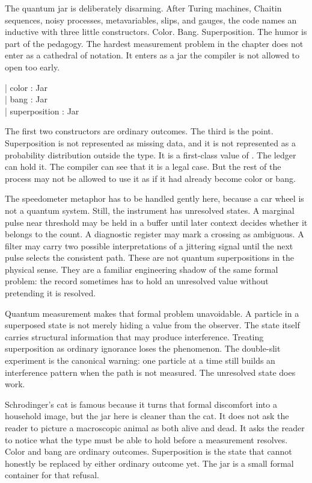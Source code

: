 The quantum jar is deliberately disarming. After Turing machines, Chaitin
sequences, noisy processes, metavariables, slips, and gauges, the code names an
inductive with three little constructors. Color. Bang. Superposition. The
humor is part of the pedagogy. The hardest measurement problem in the chapter
does not enter as a cathedral of notation. It enters as a jar the compiler is
not allowed to open too early.

\begin{leancode}
| color : Jar\\
| bang : Jar\\
| superposition : Jar
\end{leancode}

The first two constructors are ordinary outcomes. The third is the point.
Superposition is not represented as missing data, and it is not represented as
a probability distribution outside the type. It is a first-class value of
. The ledger can hold it. The compiler can see that it is a legal
case. But the rest of the process may not be allowed to use it as if it had
already become color or bang.

The speedometer metaphor has to be handled gently here, because a car wheel is
not a quantum system. Still, the instrument has unresolved states. A marginal
pulse near threshold may be held in a buffer until later context decides
whether it belongs to the count. A diagnostic register may mark a crossing as
ambiguous. A filter may carry two possible interpretations of a jittering
signal until the next pulse selects the consistent path. These are not quantum
superpositions in the physical sense. They are a familiar engineering shadow of
the same formal problem: the record sometimes has to hold an unresolved value
without pretending it is resolved.

Quantum measurement makes that formal problem unavoidable. A particle in a
superposed state is not merely hiding a value from the observer. The state
itself carries structural information that may produce interference. Treating
superposition as ordinary ignorance loses the phenomenon. The double-slit
experiment is the canonical warning: one particle at a time still builds an
interference pattern when the path is not measured. The unresolved state does
work.

Schrodinger's cat is famous because it turns that formal discomfort into a
household image, but the jar here is cleaner than the cat. It does not ask the
reader to picture a macroscopic animal as both alive and dead. It asks the
reader to notice what the type must be able to hold before a measurement
resolves. Color and bang are ordinary outcomes. Superposition is the state that
cannot honestly be replaced by either ordinary outcome yet. The jar is a small
formal container for that refusal.

